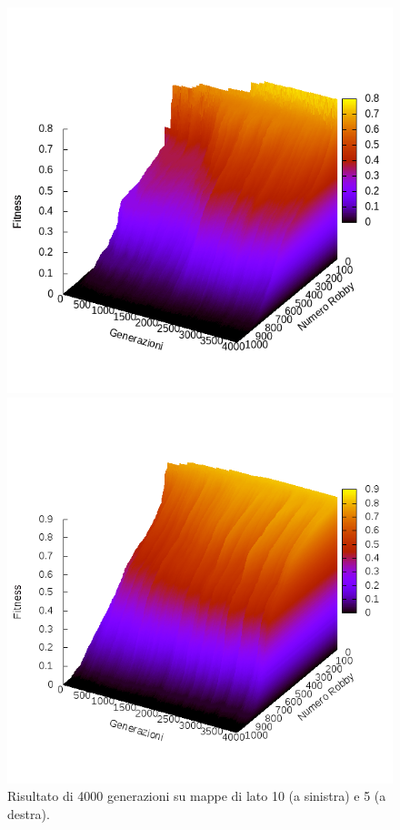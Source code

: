 \begin{figure}[H]
\centering
\begin{minipage}{.45\textwidth}
	\centering
	\includegraphics[width=\textwidth]{img/graph10x10.png}
\end{minipage}
\begin{minipage}{.45\textwidth}
	\centering
	\includegraphics[width=\textwidth]{img/graph5x5.png}
\end{minipage}
\caption{Risultato di 4000 generazioni su mappe di lato 10 (a sinistra) e 5 (a
destra).}
\end{figure}

